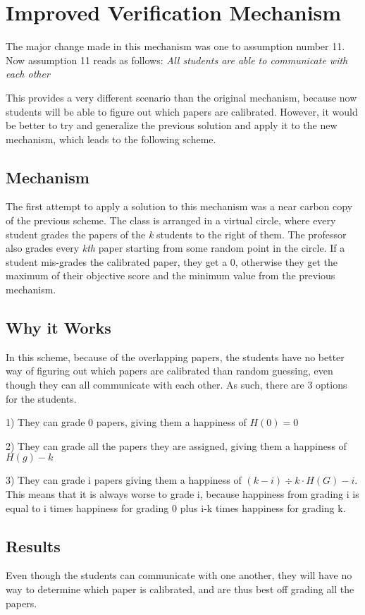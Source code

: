 \documentclass[12pt, Arial]{article}
\begin{document}
\section{Improved Verification Mechanism}
The major change made in this mechanism was one to assumption number 11. Now assumption 11 reads as follows:
\emph{All students are able to communicate with each other}

This provides a very different scenario than the original mechanism, because now students will be able to figure out which papers are calibrated. However, it would be better to try and generalize the previous solution and apply it to the new mechanism, which leads to the following scheme.

\subsection{Mechanism}
The first attempt to apply a solution to this mechanism was a near carbon copy of the previous scheme.
The class is arranged in a virtual circle, where every student grades the papers of the \emph{k} students to the right of them. The professor also grades every \emph{kth} paper starting from some random point in the circle. If a student mis-grades the calibrated paper, they get a 0, otherwise they get the maximum of their objective score and the minimum value from the previous mechanism.

\subsection{Why it Works}
In this scheme, because of the overlapping papers, the students have no better way of figuring out which papers are calibrated than random guessing, even though they can all communicate with each other. As such, there are 3 options for the students.

1) They can grade 0 papers, giving them a happiness of $H(0) = 0$

2) They can grade all the papers they are assigned, giving them a happiness of $H(g) - k$

3) They can grade i papers giving them a happiness of $(k-i)\div k \cdot H(G)-i$. This means that it is always worse to grade i, because happiness from grading i is equal to i times happiness for grading 0 plus i-k times happiness for grading k.

\subsection{Results}
Even though the students can communicate with one another, they will have no way to determine which paper is calibrated, and are thus best off grading all the papers.
\end{document}

